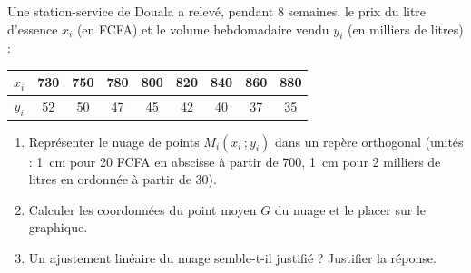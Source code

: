 \documentclass[11pt]{article}
\begin{document}
\begin{exercice}
Une station-service de Douala a relevé, pendant 8 semaines, le prix du litre d'essence $x_i$ (en FCFA) et le volume hebdomadaire vendu $y_i$ (en milliers de litres) :

\begin{center}
\begin{tabular}{|c|c|c|c|c|c|c|c|c|}
\hline
$x_i$ & 730 & 750 & 780 & 800 & 820 & 840 & 860 & 880 \\
\hline
$y_i$ & 52 & 50 & 47 & 45 & 42 & 40 & 37 & 35 \\
\hline
\end{tabular}
\end{center}

\begin{enumerate}
\item Représenter le nuage de points $M_i(x_i\,;y_i)$ dans un repère orthogonal (unités : \SI{1}{cm} pour 20 FCFA en abscisse à partir de 700, \SI{1}{cm} pour 2 milliers de litres en ordonnée à partir de 30).
\item Calculer les coordonnées du point moyen $G$ du nuage et le placer sur le graphique.
\item Un ajustement linéaire du nuage semble-t-il justifié ? Justifier la réponse.
\end{enumerate}
\end{exercice}
\end{document}

